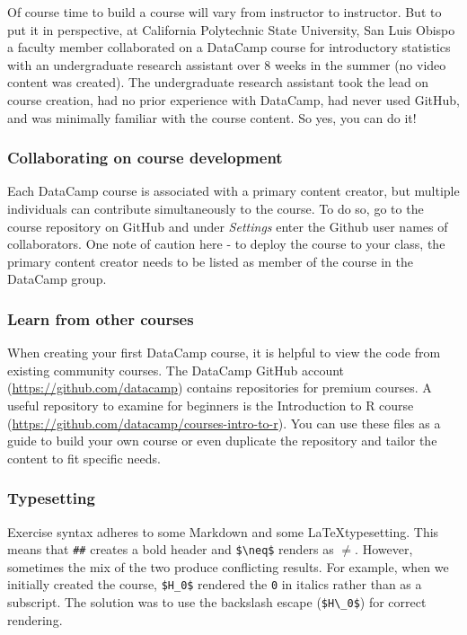 \documentclass{tise_style_doi}
\begin{document}
Of course time to build a course will vary from instructor to instructor.  But to
put it in perspective, at California Polytechnic State University, San Luis Obispo a faculty
member collaborated on a DataCamp course for introductory statistics with an
undergraduate research assistant over 8 weeks in the summer (no video content
was created).  The undergraduate research assistant took the lead on course creation,
had no prior experience with DataCamp, had never used GitHub, and was minimally
familiar with the course content. So yes, you can do it!

\subsubsection{Collaborating on course development}

Each DataCamp course is associated with a primary content creator, but multiple individuals
can contribute simultaneously to the course.  To do so, go to the course repository on GitHub
and under \textit{Settings} enter the Github user names of collaborators. One note of caution
here - to deploy the course to your class, the primary content creator needs to be listed
as member of the course in the DataCamp group.

\subsubsection{Learn from other courses}

When creating your first DataCamp course, it is helpful to view the code from existing
community courses. The DataCamp GitHub account (\url{https://github.com/datacamp})
contains repositories for premium courses.  A useful repository to examine for
beginners is the Introduction to R course (\url{https://github.com/datacamp/courses-intro-to-r}).
You can use these files as a guide to build your own course or even duplicate the repository
and tailor the content to fit specific needs.

\subsubsection{Typesetting}

Exercise syntax adheres to some Markdown and some \LaTeX typesetting.  This means that
\texttt{\#\#} creates a bold header and \verb|$\neq$| renders as \texttt{$\neq$}. However,
sometimes the mix of the two produce conflicting results.  For example, when we initially
created the course, \verb|$H_0$| rendered the \texttt{0} in italics rather than as
a subscript.  The solution was to use the backslash escape (\verb|$H\_0$|) for
correct rendering.
\end{document}
